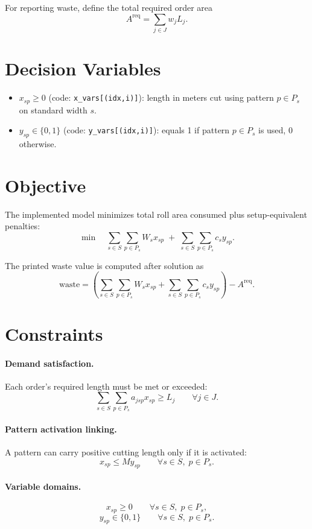 For reporting waste, define the total required order area
\[
A^{\mathrm{req}} = \sum_{j \in J} w_j L_j.
\]

\section*{Decision Variables}

\begin{itemize}
\item $x_{sp} \ge 0$ (code: \texttt{x\_vars[(idx,i)]}): length in meters cut using pattern $p \in P_s$ on standard width $s$.
\item $y_{sp} \in \{0,1\}$ (code: \texttt{y\_vars[(idx,i)]}): equals 1 if pattern $p \in P_s$ is used, 0 otherwise.
\end{itemize}

\section*{Objective}

The implemented model minimizes total roll area consumed plus setup-equivalent penalties:
\[
\min \quad
\sum_{s \in S}\sum_{p \in P_s} W_s x_{sp}
\;+\;
\sum_{s \in S}\sum_{p \in P_s} c_s y_{sp}.
\]

The printed waste value is computed after solution as
\[
\text{waste}
=
\left(
\sum_{s \in S}\sum_{p \in P_s} W_s x_{sp}
+
\sum_{s \in S}\sum_{p \in P_s} c_s y_{sp}
\right)
-
A^{\mathrm{req}}.
\]

\section*{Constraints}

\paragraph{Demand satisfaction.}
Each order's required length must be met or exceeded:
\[
\sum_{s \in S}\sum_{p \in P_s} a_{jsp} x_{sp} \ge L_j
\qquad \forall j \in J.
\]

\paragraph{Pattern activation linking.}
A pattern can carry positive cutting length only if it is activated:
\[
x_{sp} \le M y_{sp}
\qquad \forall s \in S,\; p \in P_s.
\]

\paragraph{Variable domains.}
\[
x_{sp} \ge 0
\qquad \forall s \in S,\; p \in P_s,
\]
\[
y_{sp} \in \{0,1\}
\qquad \forall s \in S,\; p \in P_s.
\]

